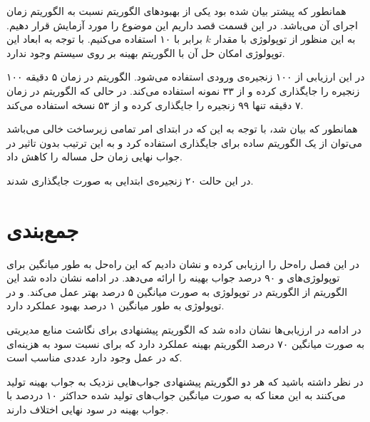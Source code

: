 همانطور که پیشتر بیان شده بود یکی از بهبودهای الگوریتم  نسبت به
الگوریتم 
زمان اجرای آن می‌باشد.
در این قسمت قصد داریم این موضوع را مورد آزمایش قرار دهیم.
به این منظور از توپولوژی  با مقدار \(k\) برابر با ۱۰ استفاده می‌کنیم.
با توجه به ابعاد این توپولوژی امکان حل آن با الگوریتم بهینه بر روی سیستم  وجود ندارد.

در این ارزیابی از ۱۰۰ زنجیره‌ی ورودی استفاده می‌شود. الگوریتم 
در زمان ۵ دقیقه ۱۰۰ زنجیره را جایگذاری کرده و از ۳۳ نمونه
استفاده می‌کند. در حالی که الگوریتم 
در زمان ۷ دقیقه تنها ۹۹ زنجیره را جایگذاری کرده و از ۵۳ نسخه
استفاده می‌کند.

همانطور که بیان شد، با توجه به این که در ابتدای امر تمامی زیرساخت خالی می‌باشد
می‌توان از یک الگوریتم ساده برای جایگذاری استفاده کرد و به این ترتیب
بدون تاثیر در جواب نهایی زمان حل مساله را کاهش داد.

در این حالت ۲۰ زنجیره‌ی ابتدایی به صورت 
جایگذاری شدند.


\section{جمع‌بندی}
در این فصل راه‌حل  را ارزیابی کرده و نشان دادیم
که این راه‌حل به طور میانگین برای توپولوژی‌های  و 
۹۰ درصد جواب بهینه را ارائه می‌دهد.
در ادامه نشان داده شد این الگوریتم از الگوریتم 
در توپولوژی 
به صورت میانگین ۵ درصد بهتر عمل می‌کند.
و در توپولوژی 
به طور میانگین ۱ درصد بهبود عملکرد دارد.

در ادامه در ارزیابی‌ها نشان داده شد که الگوریتم پیشنهادی برای نگاشت منابع مدیریتی
به صورت میانگین ۷۰ درصد الگوریتم بهینه عملکرد دارد
که برای نسبت سود به هزینه‌ای که در عمل وجود دارد عددی مناسب است.

در نظر داشته باشید که هر دو الگوریتم پیشنهادی جواب‌هایی نزدیک به جواب بهینه تولید می‌کنند به این معنا
که به صورت میانگین جواب‌های تولید شده حداکثر ۱۰ دردصد با جواب بهینه در سود نهایی اختلاف دارند.